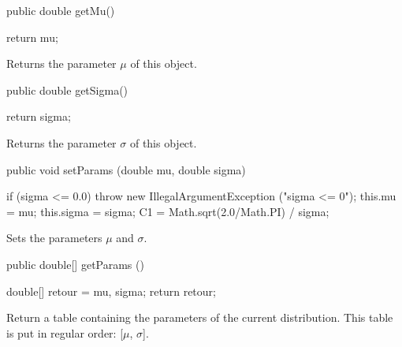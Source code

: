 \begin{htmlonly}
\end{htmlonly}
\begin{code}

   public double getMu()\begin{hide} {
      return mu;
   }\end{hide}
\end{code}
  \begin{tabb} Returns the parameter $\mu$ of this object.
  \end{tabb}
\begin{htmlonly}
\end{htmlonly}
\begin{code}

   public double getSigma()\begin{hide} {
      return sigma;
   }\end{hide}
\end{code}
  \begin{tabb} Returns the parameter $\sigma$ of this object.
  \end{tabb}
\begin{htmlonly}
\end{htmlonly}
\begin{code}

   public void setParams (double mu, double sigma) \begin{hide} {
      if (sigma <= 0.0)
         throw new IllegalArgumentException ("sigma <= 0");
      this.mu = mu;
      this.sigma = sigma;
      C1 = Math.sqrt(2.0/Math.PI) / sigma;
    } \end{hide}
\end{code}
\begin{tabb} Sets the parameters $\mu$ and $\sigma$.
\end{tabb}
\begin{htmlonly}
\end{htmlonly}
\begin{code}

   public double[] getParams ()\begin{hide} {
      double[] retour = {mu, sigma};
      return retour;
   }\end{hide}
\end{code}
\begin{tabb}
   Return a table containing the parameters of the current distribution.
   This table is put in regular order: [$\mu$, $\sigma$].
\end{tabb}
